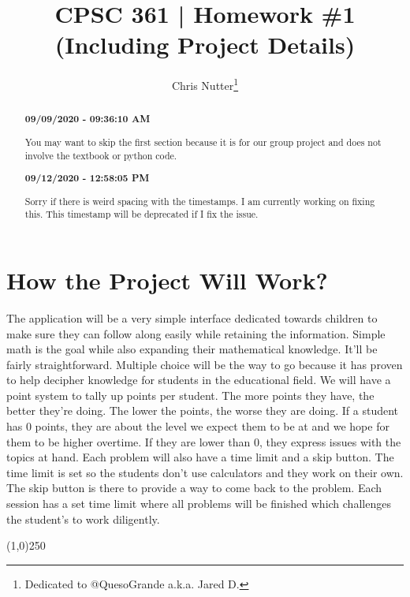 \documentclass[12pt,a4paper]{article}
\title{CPSC 361 | Homework \#1 \\(Including Project Details)}
\author{Chris Nutter\thanks{Dedicated to @QuesoGrande a.k.a. Jared D.}}
\begin{document}
\maketitle

\begin{abstract}
    \noindent
    \begin{center}\textbf{09/09/2020 - 09:36:10 AM}\end{center}
    You may want to skip the first section because it is for our group project and does not involve the textbook or python code.\\
    \begin{center}\textbf{09/12/2020 - 12:58:05 PM}\end{center}
    Sorry if there is weird spacing with the timestamps. I am currently working on fixing this. This timestamp will be deprecated if I fix the issue.\\
\end{abstract}

\tableofcontents    


\section{How the Project Will Work?}
    The application will be a very simple interface dedicated towards children to make sure they can follow along easily while retaining the information. Simple math is the goal while also expanding their mathematical knowledge. It'll be fairly straightforward. Multiple choice will be the way to go because it has proven to help decipher knowledge for students in the educational field. We will have a point system to tally up points per student. The more points they have, the better they're doing. The lower the points, the worse they are doing. If a student has 0 points, they are about the level we expect them to be at and we hope for them to be higher overtime. If they are lower than 0, they express issues with the topics at hand. Each problem will also have a time limit and a skip button. The time limit is set so the students don't use calculators and they work on their own. The skip button is there to provide a way to come back to the problem. Each session has a set time limit where all problems will be finished which challenges the student's to work diligently.\par
    \begin{center}\line(1,0){250}\end{center}
\end{document}
